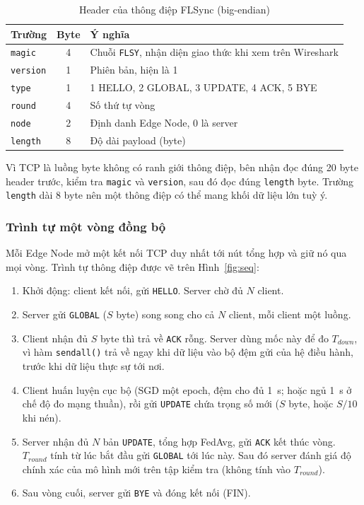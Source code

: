 \begin{table}[H]
    \centering
    \caption{Header của thông điệp FLSync (big-endian)}
    \label{tab:hdr}
    \begin{tabular}{l c l}
        \toprule
        \textbf{Trường} & \textbf{Byte} & \textbf{Ý nghĩa} \\
        \midrule
        \texttt{magic} & 4 & Chuỗi \texttt{FLSY}, nhận diện giao thức khi xem trên Wireshark \\
        \texttt{version} & 1 & Phiên bản, hiện là 1 \\
        \texttt{type} & 1 & 1 HELLO, 2 GLOBAL, 3 UPDATE, 4 ACK, 5 BYE \\
        \texttt{round} & 4 & Số thứ tự vòng \\
        \texttt{node} & 2 & Định danh Edge Node, 0 là server \\
        \texttt{length} & 8 & Độ dài payload (byte) \\
        \bottomrule
    \end{tabular}
\end{table}

Vì TCP là luồng byte không có ranh giới thông điệp, bên nhận đọc đúng 20 byte header trước, kiểm tra \texttt{magic} và \texttt{version}, sau đó đọc đúng \texttt{length} byte. Trường \texttt{length} dài 8 byte nên một thông điệp có thể mang khối dữ liệu lớn tuỳ ý.

\subsubsection{Trình tự một vòng đồng bộ}
Mỗi Edge Node mở một kết nối TCP duy nhất tới nút tổng hợp và giữ nó qua mọi vòng. Trình tự thông điệp được vẽ trên Hình~\ref{fig:seq}:
\begin{enumerate}
    \item Khởi động: client kết nối, gửi \texttt{HELLO}. Server chờ đủ $N$ client.
    \item Server gửi \texttt{GLOBAL} ($S$ byte) song song cho cả $N$ client, mỗi client một luồng.
    \item Client nhận đủ $S$ byte thì trả về \texttt{ACK} rỗng. Server dùng mốc này để đo $T_{down}$, vì hàm \texttt{sendall()} trả về ngay khi dữ liệu vào bộ đệm gửi của hệ điều hành, trước khi dữ liệu thực sự tới nơi.
    \item Client huấn luyện cục bộ (SGD một epoch, đệm cho đủ 1~s; hoặc ngủ 1~s ở chế độ đo mạng thuần), rồi gửi \texttt{UPDATE} chứa trọng số mới ($S$ byte, hoặc $S/10$ khi nén).
    \item Server nhận đủ $N$ bản \texttt{UPDATE}, tổng hợp FedAvg, gửi \texttt{ACK} kết thúc vòng. $T_{round}$ tính từ lúc bắt đầu gửi \texttt{GLOBAL} tới lúc này. Sau đó server đánh giá độ chính xác của mô hình mới trên tập kiểm tra (không tính vào $T_{round}$).
    \item Sau vòng cuối, server gửi \texttt{BYE} và đóng kết nối (FIN).
\end{enumerate}

